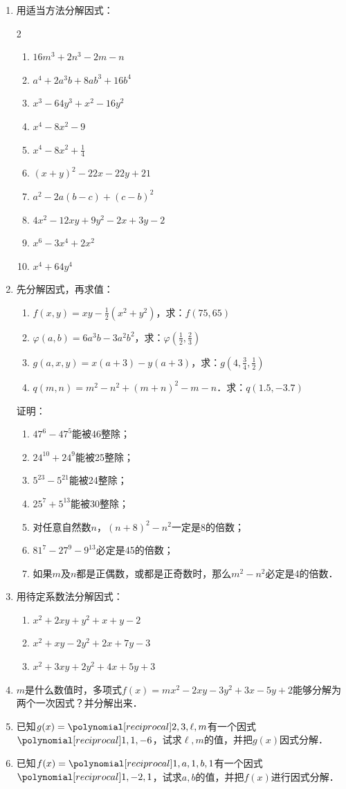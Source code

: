 \begin{enumerate}
    \item 用适当方法分解因式：
    \begin{multicols}{2}
\begin{enumerate}
    \item $16m^3+2n^3-2m-n$
    \item $a^4+2a^3b+8ab^3+16b^4$
    \item $x^3-64y^3+x^2-16y^2$
    \item $x^4-8x^2-9$
    \item $x^4-8x^2+\frac{1}{4}$
    \item $(x+y)^2-22x-22y+21$
    \item $a^2-2a(b-c)+(c-b)^2$
    \item $4x^2-12xy+9y^2-2x+3y-2$
    \item $x^6-3x^4+2x^2$
    \item $x^4+64y^4$
\end{enumerate}
\end{multicols}
    \item 先分解因式，再求值：
\begin{enumerate}
    \item $f(x,y)=xy-\frac{1}{2}(x^2+y^2)$，求：$f(75,65)$
    \item $\varphi(a,b)=6a^3b-3a^2b^2$，求：$\varphi\left(\frac{1}{2},\frac{2}{3}\right)$    
    \item $g(a,x,y)=x(a+3)-y(a+3)$，求：$g\left(4,\frac{3}{4},\frac{1}{2}\right)$
    \item $q(m,n)=m^2-n^2+(m+n)^2-m-n$．求：$q(1.5,-3.7)$
\end{enumerate}
    \staritem 证明：
\begin{enumerate}
    \item $47^6-47^5$能被46整除；
    \item $24^{10}+24^9$能被25整除；
    \item $5^{23}-5^{21}$能被24整除；
    \item $25^7+5^{13}$能被30整除；
    \item 对任意自然数$n$，$(n+8)^2-n^2$一定是8的倍数；
    \item $81^7-27^9-9^{13}$必定是45的倍数；
    \item 如果$m$及$n$都是正偶数，或都是正奇数时，那么$m^2-n^2$必定是4的倍数．
\end{enumerate}
    \item 用待定系数法分解因式：
    \begin{enumerate}
    \item $x^2+2xy+y^2+x+y-2$
    \item $x^2+xy-2y^2+2x+7y-3$
    \item $x^2+3xy+2y^2+4x+5y+3$
\end{enumerate}
    \item $m$是什么数值时，多项式$f(x)=mx^2-2xy-3y^2+3x-5y+2$能够分解为两个一次因式？并分解出来．
    \item 已知$g(x)=\poly{2,3,\ell,m}$有一个因式$\poly{1,1,-6}$，试求$\ell,m$的值，并把$g(x)$因式分解．
    \item 已知$f(x)=\poly{1,a,1,b,1}$有一个因式$\poly{1,-2,1}$，试求$a,b$的值，并把$f(x)$进行因式分解．
\end{enumerate}

